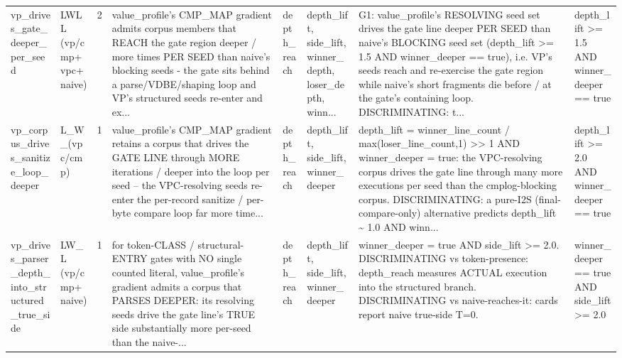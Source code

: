 \documentclass[7pt]{extarticle}
\begin{document}
{\begin{longtable}{@{}p{2.4cm}p{1.9cm}rp{4.3cm}p{1.5cm}p{1.7cm}p{4.6cm}p{3.0cm}@{}}
vp\_\allowbreak drives\_\allowbreak gate\_\allowbreak deeper\_\allowbreak per\_\allowbreak seed & LWLL (vp/cmp+vpc+naive) & 2 & value\_\allowbreak profile's CMP\_\allowbreak MAP gradient admits corpus members that REACH the gate region deeper / more times PER SEED than naive's blocking seeds - the gate sits behind a parse/VDBE/shaping loop and VP's structured seeds re-enter and ex... & depth\_\allowbreak reach & depth\_\allowbreak lift, side\_\allowbreak lift, winner\_\allowbreak depth, loser\_\allowbreak depth, winn... & G1: value\_\allowbreak profile's RESOLVING seed set drives the gate line deeper PER SEED than naive's BLOCKING seed set (depth\_\allowbreak lift \textgreater{}= 1.5 AND winner\_\allowbreak deeper == true), i.e. VP's seeds reach and re-exercise the gate region while naive's short fragments die before / at the gate's containing loop. DISCRIMINATING: t... & depth\_\allowbreak lift \textgreater{}= 1.5 AND winner\_\allowbreak deeper == true\\
vp\_\allowbreak corpus\_\allowbreak drives\_\allowbreak sanitize\_\allowbreak loop\_\allowbreak deeper & L\_\allowbreak W\_\allowbreak  (vpc/cmp) & 1 & value\_\allowbreak profile's CMP\_\allowbreak MAP gradient retains a corpus that drives the GATE LINE through MORE iterations / deeper into the loop per seed -- the VPC-resolving seeds re-enter the per-record sanitize / per-byte compare loop far more time... & depth\_\allowbreak reach & depth\_\allowbreak lift, side\_\allowbreak lift, winner\_\allowbreak deeper & depth\_\allowbreak lift = winner\_\allowbreak line\_\allowbreak count / max(loser\_\allowbreak line\_\allowbreak count,1) \textgreater{}\textgreater{} 1 AND winner\_\allowbreak deeper = true: the VPC-resolving corpus drives the gate line through many more executions per seed than the cmplog-blocking corpus. DISCRIMINATING: a pure-I2S (final-compare-only) alternative predicts depth\_\allowbreak lift \textasciitilde{} 1.0 AND winn... & depth\_\allowbreak lift \textgreater{}= 2.0 AND winner\_\allowbreak deeper == true\\
vp\_\allowbreak drives\_\allowbreak parser\_\allowbreak depth\_\allowbreak into\_\allowbreak structured\_\allowbreak true\_\allowbreak side & LW\_\allowbreak L (vp/cmp+naive) & 1 & for token-CLASS / structural-ENTRY gates with NO single counted literal, value\_\allowbreak profile's gradient admits a corpus that PARSES DEEPER: its resolving seeds drive the gate line's TRUE side substantially more per-seed than the naive-... & depth\_\allowbreak reach & depth\_\allowbreak lift, side\_\allowbreak lift, winner\_\allowbreak deeper & winner\_\allowbreak deeper = true AND side\_\allowbreak lift \textgreater{}= 2.0. DISCRIMINATING vs token-presence: depth\_\allowbreak reach measures ACTUAL execution into the structured branch. DISCRIMINATING vs naive-reaches-it: cards report naive true-side T=0. & winner\_\allowbreak deeper == true AND side\_\allowbreak lift \textgreater{}= 2.0\\

\end{longtable}}
\end{document}
